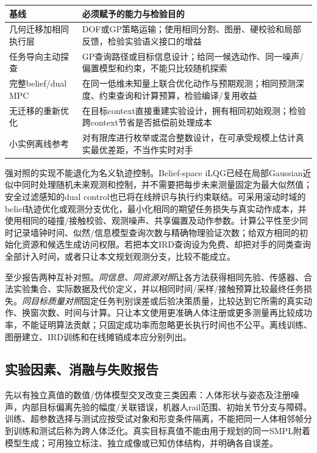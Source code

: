 \documentclass[11pt,a4paper]{article}
\numberwithin{equation}{section}
\theoremstyle{definition}
\begin{document}
\begin{center}
\small
\begin{tabular}{p{.23\linewidth}p{.65\linewidth}}
\hline
基线 & 必须赋予的能力与检验目的\\\hline
几何迁移加相同执行层 & DOF或GP策略运输；使用相同分割、图册、硬校验和局部反馈，检验实验语义接口的增益\\
任务导向主动探查 & GP查询路径或目标信息设计；给同一候选动作、同一噪声/偏置模型和约束，不能只比较随机探索\\
完整belief/dual MPC & 在同一低维未知量上联合优化动作与预期观测；相同预测深度、约束查询和计算预算，检验编译/复用收益\\
无迁移的重新优化 & 在目标context直接重建实验设计，拥有相同初始观测；检验跨context节省是否抵偿前处理成本\\
小实例离线参考 & 对有限库进行枚举或混合整数设计，在可承受规模上估计真实最优差距，不当作实时对手\\\hline
\end{tabular}
\end{center}

强对照的实现不能退化为名义轨迹控制。Belief-space iLQG已经在局部Gaussian近似中同时处理随机未来观测和控制，并不需要把每步未来测量固定为最大似然值\cite{vandenberg2012}；安全过滤感知的dual control也已将在线辨识与执行约束联结\cite{hu2024dual}。可采用滚动时域的belief轨迹优化或观测分支优化，最小化相同的期望任务损失与真实动作成本，并使用相同的碰撞/接触校验、观测噪声、共享偏置及动作参数。计算公平性至少同时记录墙钟时间、似然/信息模型查询次数与精确物理验证次数；给双方相同的初始化资源和候选生成访问权限。若把本文IRD查询设为免费、却把对手的同类查询全部计入时间，或者只让本文规划观测分支，比较不能成立。

至少报告两种互补对照。\emph{同信息、同资源对照}让各方法获得相同先验、传感器、合法实验集合、实际数据及代价定义，并以相同时间/采样/接触预算比较最终任务损失。\emph{同目标质量对照}固定任务判别误差或后验决策质量，比较达到它所需的真实动作、换窗次数、时间与计算。只让本文使用更准确人体注册或更多测量再比较成功率，不能证明算法贡献；只固定成功率而忽略更长执行时间也不公平。离线训练、图册建立、IRD训练和在线摊销成本应分别列出。

\subsection{实验因素、消融与失败报告}

先以有独立真值的数值/仿体模型交叉改变三类因素：人体形状与姿态及注册噪声，内部目标偏离先验的幅度/关联错误，机器人rail范围、初始关节分支与障碍。训练、超参数选择与测试应按受试对象和形变条件隔离，不能把同一人体相邻帧分到训练和测试后称为跨人体泛化。真实目标真值不能由用于规划的同一SMPL附着模型生成；可用独立标注、独立成像或已知仿体结构，并明确各自误差。
\end{document}

